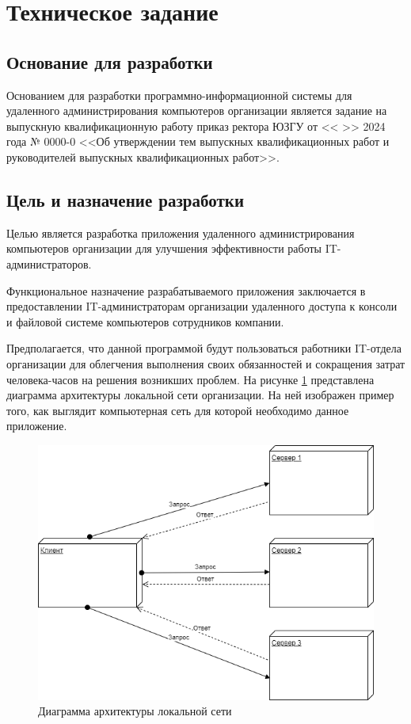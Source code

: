 \newsection
\section{Техническое задание}
\subsection{Основание для разработки}
Основанием для разработки программно-информационной системы для удаленного администрирования компьютеров организации является задание на выпускную квалификационную работу приказ ректора ЮЗГУ от <<  >>     2024 года № 0000-0 <<Об утверждении тем выпускных квалификационных работ и руководителей выпускных квалификационных работ>>.

\subsection{Цель и назначение разработки}
Целью является разработка приложения удаленного администрирования компьютеров организации для улучшения эффективности работы IT-администраторов. 

Функциональное назначение разрабатываемого приложения заключается в предоставлении IT-администраторам организации удаленного доступа к консоли и файловой системе компьютеров сотрудников компании.

Предполагается, что данной программой будут пользоваться работники IT-отдела организации для облегчения выполнения своих обязанностей и сокращения затрат человека-часов на решения возникших проблем.
На рисунке \ref{fig:-arx_diagramma} представлена диаграмма архитектуры локальной сети организации. На ней изображен пример того, как выглядит компьютерная сеть для которой необходимо данное приложение.

\begin{figure}
	\centering
	\includegraphics[width=1\linewidth]{"images/Диаграмма архитектуры"}
	\caption{Диаграмма архитектуры локальной сети}
	\label{fig:-arx_diagramma}
\end{figure}

